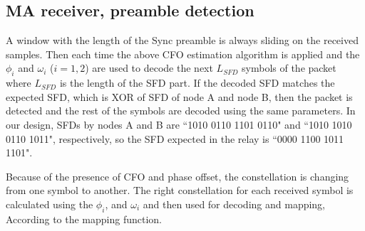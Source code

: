 \subsection{MA receiver, preamble detection}
A window with the length of the Sync preamble is always sliding on the received samples. Then each time the above CFO estimation algorithm is applied and the $\phi_i$ and $\omega_i$ ($i=1,2$) are used to decode the next $L_{SFD}$ symbols of the packet where $L_{SFD}$  is the length of the SFD part. If the decoded SFD matches the expected SFD, which is XOR of SFD of node A and node B, %
 then the packet is detected and the rest of the symbols are decoded using the same parameters. In our design, SFDs by nodes A  and B are ``1010 0110 1101 0110" and ``1010 1010 0110 1011", respectively, so the SFD expected in the relay is ``0000 1100 1011 1101". 
 
Because of the presence of CFO and phase offset, the constellation is changing from one symbol to another. The right constellation for each received symbol is calculated using the $\phi_i$, and $\omega_i$ and then used for decoding and mapping, According to the mapping function. %


